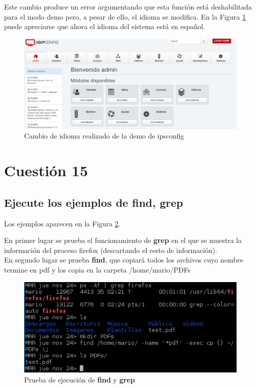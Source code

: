 Este cambio produce un error argumentando que esta función está deshabilitada para el modo demo pero, a pesar de ello, el idioma se modifica. En la Figura \ref{fig:figura75} puede apreciarse que ahora el idioma del sistema está en español.

\begin{figure}[H] %
	\centering
	\includegraphics[scale=0.3]{figuras/figura75.png} 
	\caption{Cambio de idioma realizado de la demo de ipsconfig}
	\label{fig:figura75}
\end{figure}

\newpage

\section{Cuestión 15}

\subsection{Ejecute los ejemplos de find, grep}

Los ejemplos aparecen en la Figura \ref{fig:figura76}.

En primer lugar se prueba el funcionamiento de \textbf{grep} en el que se muestra la información del proceso firefox (descartando el resto
de información).
\\

En segundo lugar se prueba \textbf{find}, que copiará todos los archivos cuyo nombre termine en pdf y los copia en
la carpeta /home/mario/PDFs

	\begin{figure}[H] %
		\centering
		\includegraphics[scale=0.8]{figuras/figura76.png} 
		\caption{Prueba de ejecución de \textbf{find} y \textbf{grep}}
		\label{fig:figura76}
	\end{figure}
	
